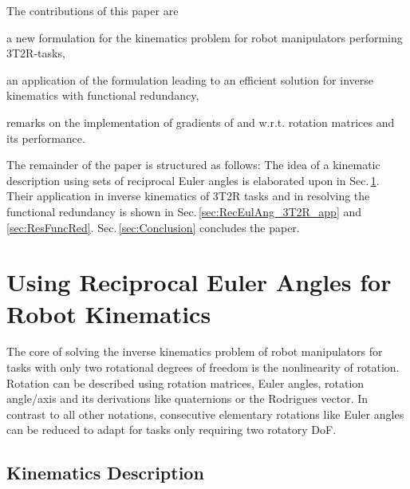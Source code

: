 \documentclass{svproc}
\begin{document}
The contributions of this paper are
\begin{compactitem}
    \item a new formulation for the kinematics problem for robot manipulators performing 3T2R-tasks,
    \item an application of the formulation leading to an efficient solution for inverse kinematics with functional redundancy,
    \item remarks on the implementation of gradients of and w.r.t. rotation matrices and its performance.
\end{compactitem}

The remainder of the paper is structured as follows: The idea of a kinematic description using sets of reciprocal Euler angles is elaborated upon in Sec.\,\ref{sec:RecEulAng}.
Their application in inverse kinematics of 3T2R tasks and in resolving the functional redundancy is shown in Sec.\,\ref{sec:RecEulAng_3T2R_app} and \ref{sec:ResFuncRed}.
Sec.\,\ref{sec:Conclusion} concludes the paper.

\section{Using Reciprocal Euler Angles for Robot Kinematics}
\label{sec:RecEulAng}

The core of solving the inverse kinematics problem of robot manipulators for tasks with only two rotational degrees of freedom is the nonlinearity of rotation.
Rotation can be described using rotation matrices, Euler angles, rotation angle/axis and its derivations like quaternions or the Rodrigues vector.
In contrast to all other notations, consecutive elementary rotations like Euler angles can be reduced to adapt for tasks only requiring two rotatory DoF.

\subsection{Kinematics Description}
\label{sec:RecEulAng_KinDesc}
\end{document}
